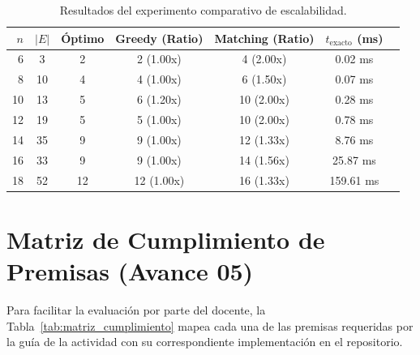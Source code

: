 \documentclass[11pt,a4paper]{article}
\begin{document}
\begin{table}[h]
\centering
\caption{Resultados del experimento comparativo de escalabilidad.}
\label{tab:resultados_experimento}
\vspace{0.2cm}
\begin{tabular}{rcccccc}
\toprule
\textbf{$n$} & \textbf{$|E|$} & \textbf{Óptimo} & \textbf{Greedy (Ratio)} & \textbf{Matching (Ratio)} & \textbf{$t_{\text{exacto}}$ (ms)} \\
\midrule
6  & 3  & 2  & 2 (1.00x) & 4 (2.00x) & 0.02 ms \\
8  & 10 & 4  & 4 (1.00x) & 6 (1.50x) & 0.07 ms \\
10 & 13 & 5  & 6 (1.20x) & 10 (2.00x) & 0.28 ms \\
12 & 19 & 5  & 5 (1.00x) & 10 (2.00x) & 0.78 ms \\
14 & 35 & 9  & 9 (1.00x) & 12 (1.33x) & 8.76 ms \\
16 & 33 & 9  & 9 (1.00x) & 14 (1.56x) & 25.87 ms \\
18 & 52 & 12 & 12 (1.00x) & 16 (1.33x) & 159.61 ms \\
\bottomrule
\end{tabular}
\end{table}

\section{Matriz de Cumplimiento de Premisas (Avance 05)}
Para facilitar la evaluación por parte del docente, la Tabla~\ref{tab:matriz_cumplimiento} mapea cada una de las premisas requeridas por la guía de la actividad con su correspondiente implementación en el repositorio.
\end{document}
